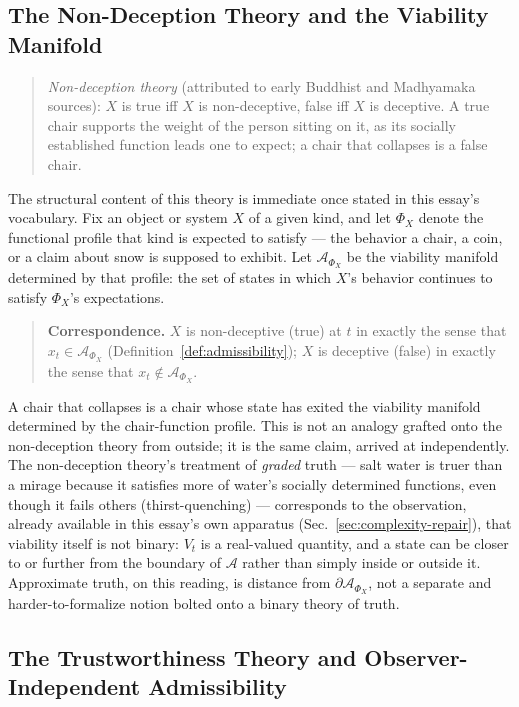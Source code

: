 \documentclass[12pt,a4paper]{article}
\theoremstyle{plain}
\theoremstyle{definition}
\theoremstyle{remark}
\newcommand{\Adm}{\mathcal{A}}
\begin{document}
\subsection{The Non-Deception Theory and the Viability Manifold}
\label{subsec:non-deception-viability}

\begin{quote}
\emph{Non-deception theory} (attributed to early Buddhist and Madhyamaka sources): $X$ is true iff $X$ is non-deceptive, false iff $X$ is deceptive. A true chair supports the weight of the person sitting on it, as its socially established function leads one to expect; a chair that collapses is a false chair.
\end{quote}

The structural content of this theory is immediate once stated in this essay's vocabulary. Fix an object or system $X$ of a given kind, and let $\Phi_X$ denote the functional profile that kind is expected to satisfy — the behavior a chair, a coin, or a claim about snow is supposed to exhibit. Let $\Adm_{\Phi_X}$ be the viability manifold determined by that profile: the set of states in which $X$'s behavior continues to satisfy $\Phi_X$'s expectations.

\begin{quote}
\textbf{Correspondence.} $X$ is non-deceptive (true) at $t$ in exactly the sense that $x_t \in \Adm_{\Phi_X}$ (Definition~\ref{def:admissibility}); $X$ is deceptive (false) in exactly the sense that $x_t \notin \Adm_{\Phi_X}$.
\end{quote}

A chair that collapses is a chair whose state has exited the viability manifold determined by the chair-function profile. This is not an analogy grafted onto the non-deception theory from outside; it is the same claim, arrived at independently. The non-deception theory's treatment of \emph{graded} truth — salt water is truer than a mirage because it satisfies more of water's socially determined functions, even though it fails others (thirst-quenching) — corresponds to the observation, already available in this essay's own apparatus (Sec.~\ref{sec:complexity-repair}), that viability itself is not binary: $V_t$ is a real-valued quantity, and a state can be closer to or further from the boundary of $\Adm$ rather than simply inside or outside it. Approximate truth, on this reading, is distance from $\partial\Adm_{\Phi_X}$, not a separate and harder-to-formalize notion bolted onto a binary theory of truth.

\subsection{The Trustworthiness Theory and Observer-Independent Admissibility}
\label{subsec:trustworthiness-objective}
\end{document}
